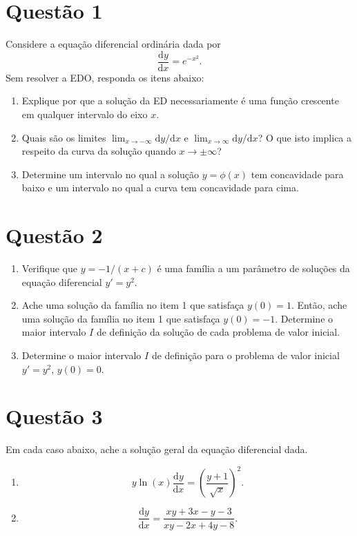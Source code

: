 \documentclass[oneside,12pt,a4paper]{article}
\begin{document}
    \pagebreak

    \section*{Questão 1}

    Considere a equação diferencial ordinária dada por
    $$
        \frac{\mathrm dy}{\mathrm dx} = e^{-x^2}.
    $$
    Sem resolver a EDO, responda os itens abaixo:
    \begin{enumerate}
        \item Explique por que a solução da ED necessariamente é uma função crescente em qualquer intervalo do eixo $x$.

        \item Quais são os limites $\displaystyle\lim_{x\to-\infty}\mathrm dy/\mathrm dx$ e $\displaystyle\lim_{x\to\infty}\mathrm dy/\mathrm dx$? O que isto implica a respeito da curva da solução quando $x\to\pm\infty$?

        \item Determine um intervalo no qual a solução $y=\phi(x)$ tem concavidade para baixo e um intervalo no qual a curva tem concavidade para cima.
    \end{enumerate}

    \section*{Questão 2}

    \begin{enumerate}
        \item Verifique que $y=-1/(x+c)$ é uma família a um parâmetro de soluções da equação diferencial $y'=y^2$.

        \item Ache uma solução da família no item 1 que satisfaça $y(0)=1$. Então, ache uma solução da família no item 1 que satisfaça $y(0)=-1$. Determine o maior intervalo $I$ de definição da solução de cada problema de valor inicial.

        \item Determine o maior intervalo $I$ de definição para o problema de valor inicial $y'=y^2$, $y(0)=0$.
    \end{enumerate}

    \section*{Questão 3}

    Em cada caso abaixo, ache a solução geral da equação diferencial dada.
    \begin{enumerate}
        \item
        $$
            y\ln(x)\frac{\mathrm dy}{\mathrm dx}=\left(\frac{y+1}{\sqrt x}\right)^2.
        $$
        \item
        $$
            \frac{\mathrm dy}{\mathrm dx}=\frac{xy+3x-y-3}{xy-2x+4y-8}.
        $$
    \end{enumerate}
\end{document}
